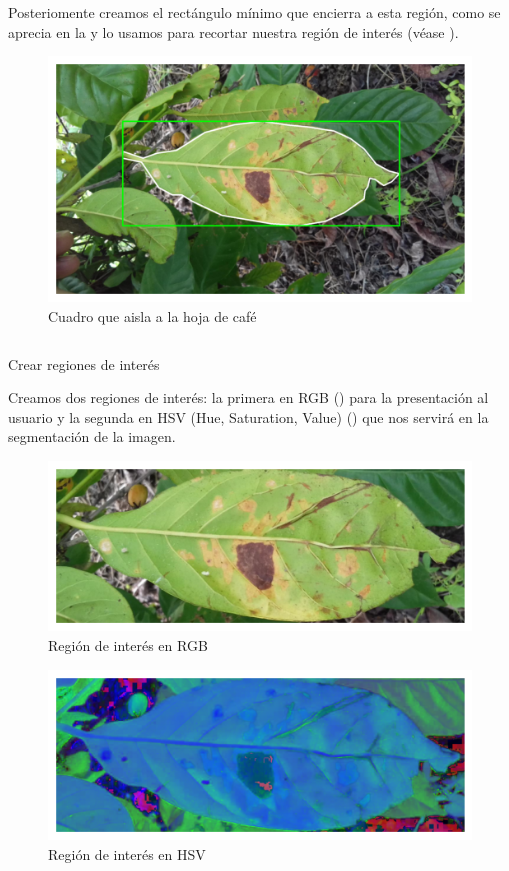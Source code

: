 Posteriomente creamos el rectángulo mínimo que encierra a esta región, como se aprecia en la  y lo usamos para recortar nuestra región de interés (véase ).

\begin{figure}[H]
\centering
\includegraphics[scale=1]{images/bounding_rect.png}
\caption{Cuadro que aisla a la hoja de café}
\label{img:bounding_rect}
\end{figure}

\begin{listing}[H]
\inputminted{python}{code_listings/roi.py}
\caption{Crear regiones de interés}
\label{code:roi}
\end{listing}

Creamos dos regiones de interés: la primera en \textsf{RGB} () para la presentación al usuario y la segunda en \textsf{HSV} (Hue, Saturation, Value) () que nos servirá en la segmentación de la imagen.

\begin{figure}[H]
\centering
\includegraphics[scale=1]{images/roi_rgb.png}
\caption{Región de interés en RGB}
\label{img:roi_rgb}
\end{figure}

\begin{figure}[H]
\centering
\includegraphics[scale=1]{images/roi_hsv.png}
\caption{Región de interés en HSV}
\label{img:roi_hsv}
\end{figure}

